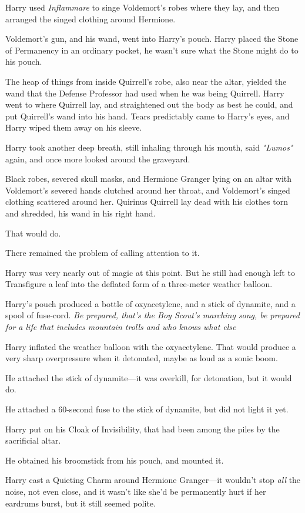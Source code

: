 Harry used \emph{Inflammare} to singe Voldemort's robes where they lay, and
then arranged the singed clothing around Hermione.

Voldemort's gun, and his wand, went into Harry's pouch. Harry placed the Stone
of Permanency in an ordinary pocket, he wasn't sure what the Stone might do to
his pouch.

The heap of things from inside Quirrell's robe, also near the altar, yielded
the wand that the Defense Professor had used when he was being Quirrell. Harry
went to where Quirrell lay, and straightened out the body as best he could, and
put Quirrell's wand into his hand. Tears predictably came to Harry's eyes, and
Harry wiped them away on his sleeve.

Harry took another deep breath, still inhaling through his mouth, said
\emph{"Lumos"} again, and once more looked around the graveyard.

Black robes, severed skull masks, and Hermione Granger lying on an altar with
Voldemort's severed hands clutched around her throat, and Voldemort's singed
clothing scattered around her. Quirinus Quirrell lay dead with his clothes torn
and shredded, his wand in his right hand.

That would do.

There remained the problem of calling attention to it.

Harry was very nearly out of magic at this point. But he still had enough left
to Transfigure a leaf into the deflated form of a three-meter weather balloon.

Harry's pouch produced a bottle of oxyacetylene, and a stick of dynamite, and a
spool of fuse-cord. \emph{Be prepared, that's the Boy Scout's marching song, be
prepared for a life that includes mountain trolls and who knows what
else{\el}}

Harry inflated the weather balloon with the oxyacetylene. That would produce a
very sharp overpressure when it detonated, maybe as loud as a sonic boom.

He attached the stick of dynamite---it was overkill, for detonation, but it
would do.

He attached a 60-second fuse to the stick of dynamite, but did not light it yet.

Harry put on his Cloak of Invisibility, that had been among the piles by the
sacrificial altar.

He obtained his broomstick from his pouch, and mounted it.

Harry cast a Quieting Charm around Hermione Granger---it wouldn't stop
\emph{all} the noise, not even close, and it wasn't like she'd be permanently
hurt if her eardrums burst, but it still seemed polite.


